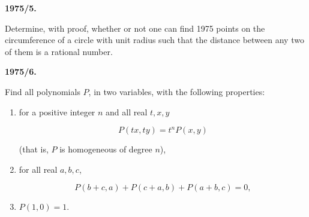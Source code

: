 \documentclass[12pt]{article}
\begin{document}
\vspace{0.4cm}

\textbf{1975/5.}

Determine, with proof, whether or not one can find 1975 points on the circumference of a circle with unit radius such that the distance between any two of them is a rational number.

\vspace{0.4cm}

\textbf{1975/6.}

Find all polynomials $P$, in two variables, with the following properties:

\begin{enumerate}
\item[(i)] for a positive integer $n$ and all real $t,x,y$

$$
P(tx,ty)=t^nP(x,y)
$$

(that is, $P$ is homogeneous of degree $n$),

\item[(ii)] for all real $a,b,c$,

$$
P(b+c,a)+P(c+a,b)+P(a+b,c)=0,
$$

\item[(iii)] $P(1,0)=1$.
\end{enumerate}
\end{document}
